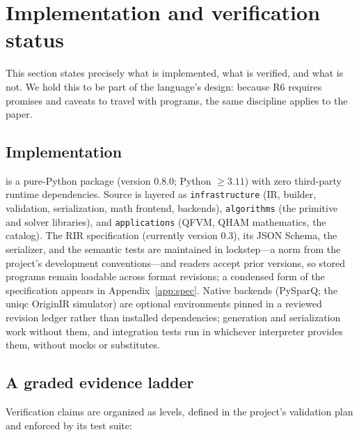 \section{Implementation and verification status}
\label{sec:implementation}

This section states precisely what is implemented, what is verified, and
what is not.  We hold this to be part of the language's design: because R6
requires promises and caveats to travel with programs, the same discipline
applies to the paper.

\subsection{Implementation}
\label{sec:implementation-status}

\pqlang{} is a pure-Python package (version 0.8.0; Python $\ge 3.11$) with
zero third-party runtime dependencies.  Source is layered as
\texttt{infrastructure} (IR, builder, validation, serialization, math
frontend, backends), \texttt{algorithms} (the primitive and solver
libraries), and \texttt{applications} (QFVM, QHAM mathematics, the catalog).
The RIR specification (currently version 0.3), its JSON Schema, the
serializer, and the semantic tests are maintained in lockstep---a norm from
the project's development conventions---and readers accept prior versions,
so stored programs remain loadable across format revisions; a condensed
form of the specification appears in Appendix~\ref{app:spec}.  Native backends
(PySparQ; the uniqc OriginIR simulator) are optional environments pinned in
a reviewed revision ledger rather than installed dependencies; generation
and serialization work without them, and integration tests run in whichever
interpreter provides them, without mocks or substitutes.

\subsection{A graded evidence ladder}
\label{sec:evidence-ladder}

Verification claims are organized as levels, defined in the project's
validation plan and enforced by its test suite:

